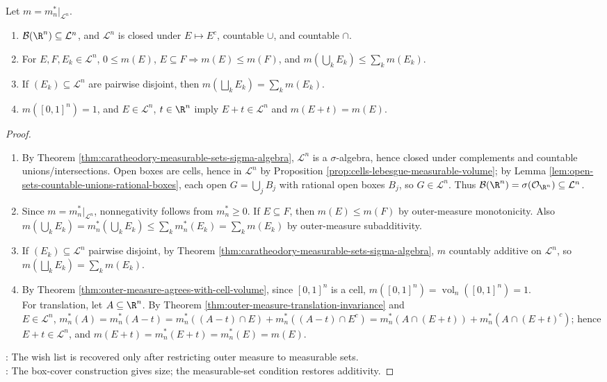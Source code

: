 \begin{theorem} \label{thm:lebesgue-measure-basic-properties-checklist} \\
Let $m=m_n^\ast|_{\mathcal{L}^n}$.
\begin{enumerate}[label=(\roman*)]
\setlength{\itemsep}{0pt}
\item $\mathcal{B}(\R^n)\subseteq\mathcal{L}^n$, and $\mathcal{L}^n$ is closed under $E\mapsto E^c$, countable $\cup$, and countable $\cap$.
\item For $E,F,E_k\in\mathcal{L}^n$, $0\leq m(E)$, $E\subseteq F\Rightarrow m(E)\leq m(F)$, and $m(\bigcup_kE_k)\leq\sum_km(E_k)$.
\item If $(E_k)\subseteq\mathcal{L}^n$ are pairwise disjoint, then $m(\bigsqcup_kE_k)=\sum_km(E_k)$.
\item $m([0,1]^n)=1$, and $E\in\mathcal{L}^n$, $t\in\R^n$ imply $E+t\in\mathcal{L}^n$ and $m(E+t)=m(E)$.
\end{enumerate}
\begin{proof}
\begin{enumerate}[label=(\roman*)]
\setlength{\itemsep}{0pt}
\item By Theorem \ref{thm:caratheodory-measurable-sets-sigma-algebra}, $\mathcal{L}^n$ is a $\sigma$-algebra, hence closed under complements and countable unions/intersections. Open boxes are cells, hence in $\mathcal{L}^n$ by Proposition \ref{prop:cells-lebesgue-measurable-volume}; by Lemma \ref{lem:open-sets-countable-unions-rational-boxes}, each open $G=\bigcup_jB_j$ with rational open boxes $B_j$, so $G\in\mathcal{L}^n$. Thus $\mathcal{B}(\R^n)=\sigma(\mathcal{O}_{\R^n})\subseteq\mathcal{L}^n$.
\item Since $m=m_n^\ast|_{\mathcal{L}^n}$, nonnegativity follows from $m_n^\ast\geq0$. If $E\subseteq F$, then $m(E)\leq m(F)$ by outer-measure monotonicity. Also $m(\bigcup_kE_k)=m_n^\ast(\bigcup_kE_k)\leq\sum_km_n^\ast(E_k)=\sum_km(E_k)$ by outer-measure subadditivity.
\item If $(E_k)\subseteq\mathcal{L}^n$ pairwise disjoint, by Theorem \ref{thm:caratheodory-measurable-sets-sigma-algebra}, $m$ countably additive on $\mathcal{L}^n$, so $m(\bigsqcup_kE_k)=\sum_km(E_k)$.
\item By Theorem \ref{thm:outer-measure-agrees-with-cell-volume}, since $[0,1]^n$ is a cell, $m([0,1]^n)=\operatorname{vol}_n([0,1]^n)=1$.\\
For translation, let $A\subseteq\R^n$. By Theorem \ref{thm:outer-measure-translation-invariance} and\\
$E\in\mathcal{L}^n$, $m_n^\ast(A)=m_n^\ast(A-t)=m_n^\ast((A-t)\cap E)+m_n^\ast((A-t)\cap E^c)=m_n^\ast(A\cap(E+t))+m_n^\ast(A\cap(E+t)^c)$; hence $E+t\in\mathcal{L}^n$, and $m(E+t)=m_n^\ast(E+t)=m_n^\ast(E)=m(E)$.
\end{enumerate}
: The wish list is recovered only after restricting outer measure to measurable sets.\\
: The box-cover construction gives size; the measurable-set condition restores additivity.
\end{proof}
\end{theorem}


